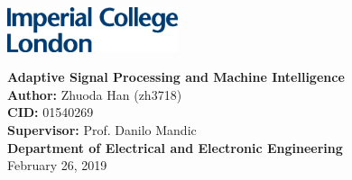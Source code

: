 \documentclass[10pt,oneside]{book}
\begin{document}

\frontmatter

\begin{titlepage}

\includegraphics[width=5cm]{images/iclogo.eps}\\[1cm]
\begin{center}
\linespread{1.2}\huge {\bfseries Adaptive Signal Processing and Machine Intelligence}\\[4cm]
\linespread{1}
{\Large \textbf{Author:} Zhuoda Han (zh3718)}\\[1.5cm]
{\large \textbf{CID:} 01540269}\\[1.5cm]
{\large \textbf{Supervisor:} Prof. Danilo Mandic}\\[4cm] %
\large \textbf {Department of Electrical and Electronic Engineering}\\[2cm]
\large February 26, 2019
\end{center}

\tableofcontents

\end{titlepage}



\mainmatter






\renewcommand\bibname{References}


\end{document}
